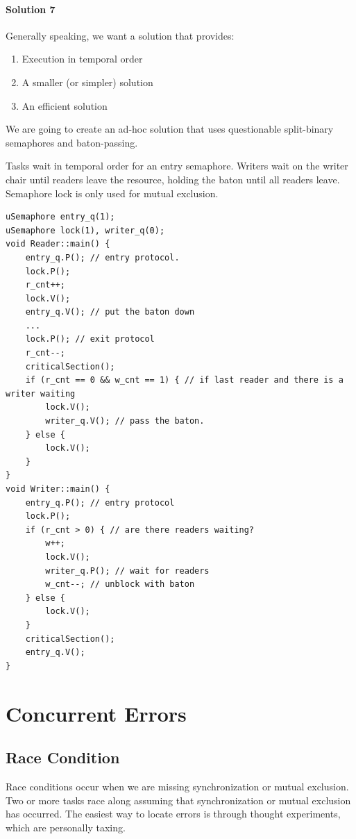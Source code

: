                 \subsubsection{Solution 7} %
                \label{ssub:solution_7}
                    Generally speaking, we want a solution that provides:
                    \begin{enumerate}
                        \item Execution in temporal order
                        \item A smaller (or simpler) solution
                        \item An efficient solution
                    \end{enumerate}
                    We are going to create an ad-hoc solution that uses questionable split-binary semaphores and baton-passing.

                    Tasks wait in temporal order for an entry semaphore.
                    Writers wait on the writer chair until readers leave the resource, holding the baton until all readers leave.
                    Semaphore lock is only used for mutual exclusion.
                    \begin{lstlisting}
uSemaphore entry_q(1);
uSemaphore lock(1), writer_q(0);
void Reader::main() {
    entry_q.P(); // entry protocol.
    lock.P();
    r_cnt++;
    lock.V();
    entry_q.V(); // put the baton down
    ...
    lock.P(); // exit protocol
    r_cnt--;
    criticalSection();
    if (r_cnt == 0 && w_cnt == 1) { // if last reader and there is a writer waiting
        lock.V();
        writer_q.V(); // pass the baton.
    } else {
        lock.V();
    }
}
void Writer::main() {
    entry_q.P(); // entry protocol
    lock.P();
    if (r_cnt > 0) { // are there readers waiting?
        w++;
        lock.V();
        writer_q.P(); // wait for readers
        w_cnt--; // unblock with baton
    } else {
        lock.V();
    }
    criticalSection();
    entry_q.V();
}

                    \end{lstlisting}
    \chapter{Concurrent Errors} %
    \label{cha:concurrent_errors}
        \section{Race Condition} %
        \label{sec:race_condition}
            Race conditions occur when we are missing synchronization or mutual exclusion.
            Two or more tasks race along assuming that synchronization or mutual exclusion has occurred.
            The easiest way to locate errors is through thought experiments, which are personally taxing.
